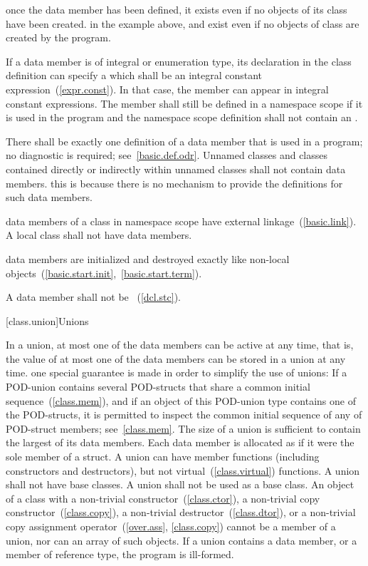 \pnum
\enternote
once the  data member has been defined, it exists even if
no objects of its class have been created.
\enterexample
in the example above,  and  exist even
if no objects of class  are created by the program.
\exitexample
\exitnote

\pnum
If a  data member is of  integral or
 enumeration type,
its declaration in the class definition can specify a
 which shall be an integral
constant expression~(\ref{expr.const}). In that case,
the member can appear in integral constant expressions. The
member shall still be defined in a namespace scope if
it is used in the program and the
namespace scope definition shall not contain an .

\pnum
There shall be exactly one definition of a  data member
that is used in a program; no diagnostic is required;
see~\ref{basic.def.odr}.
Unnamed classes and classes contained directly
or indirectly within unnamed classes shall not contain 
data members.
\enternote
this is because there is no mechanism to provide the definitions for
such  data members.
\exitnote

\pnum
{}%
 data members of a class in namespace scope have external
linkage~(\ref{basic.link}). A local class shall not have 
data members.

\pnum
{} data members are initialized and destroyed exactly like
non-local objects~(\ref{basic.start.init},~\ref{basic.start.term}).

\pnum
A  data member shall not be
~(\ref{dcl.stc}).

[class.union]{Unions}%

\pnum
In a union, at most one of the data members can be active at any
time, that is, the value of at most one of the data members can be
stored in a union at any time. \enternote one special guarantee is made in order to
simplify the use of unions: If a POD-union contains several POD-structs
that share a common initial sequence~(\ref{class.mem}), and if an object
of this POD-union type contains one of the POD-structs, it is permitted
to inspect the common initial sequence of any of POD-struct members;
see~\ref{class.mem}. \exitnote The size of a union is sufficient to contain the largest
of its data members. Each data member is allocated
as if it were the sole member of a struct. A union can have member
functions (including constructors and destructors), but not
virtual~(\ref{class.virtual}) functions. A union shall not have base
classes. A union shall not be used as a base class. An object of a class
with a non-trivial constructor~(\ref{class.ctor}), a non-trivial copy
constructor~(\ref{class.copy}), a non-trivial destructor~(\ref{class.dtor}),
or a non-trivial copy assignment operator~(\ref{over.ass},
\ref{class.copy}) cannot be a member of a union, nor can an array of
such objects. If a union contains a  data member, or a
member of reference type, the program is ill-formed.

